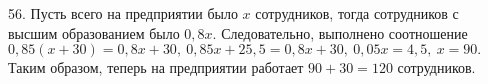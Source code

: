 56. Пусть всего на предприятии было $x$ сотрудников, тогда сотрудников с высшим образованием было $0,8x.$ Следовательно, выполнено соотношение $0,85(x+30)=0,8x+30,\ 0,85x+25,5=0,8x+30,\ 0,05x=4,5,\ x=90.$ Таким образом, теперь на предприятии работает $90+30=120$ сотрудников.\\
